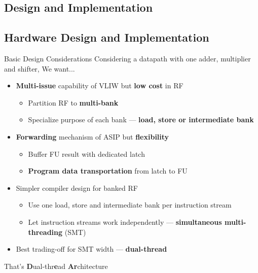 \documentclass{beamer}
\begin{document}
\begin{CJK}{UTF8}{bkai}


            \section{Design and Implementation}

            \subsection{Hardware Design and Implementation}
            \begin{frame}{Basic Design Considerations}
                Considering a datapath with one adder, multiplier and shifter, We want... \\
                \begin{itemize}
                    \item \textbf{Multi-issue} capability of VLIW but \textbf{low cost} in RF
                        \begin{itemize}
                            \item Partition RF to \textbf{multi-bank}
                            \item Specialize purpose of each bank --- \textbf{load, store or intermediate bank}
                        \end{itemize}
                    \item \textbf{Forwarding} mechanism of ASIP but \textbf{flexibility}
                        \begin{itemize}
                            \item Buffer FU result with dedicated latch
                            \item \textbf{Program data transportation} from latch to FU
                        \end{itemize}
                    \item Simpler compiler design for banked RF
                        \begin{itemize}
                            \item Use one load, store and intermediate bank per instruction stream 
                            \item Let instruction streams work independently --- \textbf{simultaneous multi-threading} (SMT)
                        \end{itemize}
                    \item Best trading-off for SMT width --- \textbf{dual-thread}
                \end{itemize}
                \large{That's \textbf{D}ual-thr\textbf{e}ad \textbf{Ar}chitecture}
            \end{frame}


\end{CJK}
\end{document}
